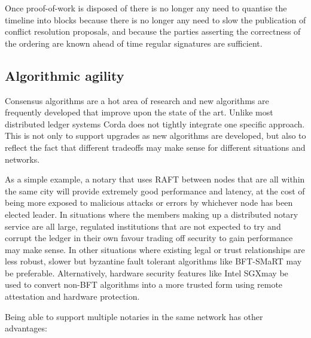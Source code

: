 \documentclass{article}
\begin{document}
Once proof-of-work is disposed of there is no longer any need to quantise the timeline into blocks because there is
no longer any need to slow the publication of conflict resolution proposals, and because the parties asserting the
correctness of the ordering are known ahead of time regular signatures are sufficient.

\subsection{Algorithmic agility}

Consensus algorithms are a hot area of research and new algorithms are frequently developed that improve upon the state
of the art. Unlike most distributed ledger systems Corda does not tightly integrate one specific approach. This is not
only to support upgrades as new algorithms are developed, but also to reflect the fact that different tradeoffs may make
sense for different situations and networks.

As a simple example, a notary that uses RAFT between nodes that are all within the same city will provide extremely good
performance and latency, at the cost of being more exposed to malicious attacks or errors by whichever node has been elected
leader. In situations where the members making up a distributed notary service are all large, regulated institutions that
are not expected to try and corrupt the ledger in their own favour trading off security to gain performance may make sense.
In other situations where existing legal or trust relationships are less robust, slower but byzantine fault tolerant
algorithms like BFT-SMaRT\cite{Bessani:2014:SMR:2671853.2672428} may be preferable. Alternatively, hardware security features
like Intel SGX\textregistered may be used to convert non-BFT algorithms into a more trusted form using remote attestation and
hardware protection.

Being able to support multiple notaries in the same network has other advantages:
\end{document}
